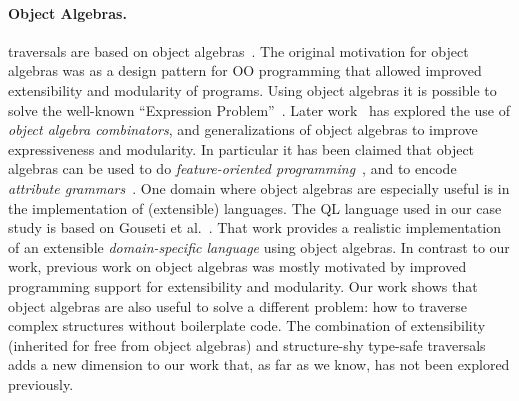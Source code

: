 

\begin{comment}
In that
approach for generalized and basic folds. These fold algebras scale up
applications involving large systems of mutually recursive
datatypes. These works all try to optimize traversal control of large
structures in functional programming paradigm, while our work solves a
similar problem in Object Algebras, a programming style in Object
Oriented Programming paradigm.
\end{comment}

\paragraph{Object Algebras.} \name traversals are based on
object algebras~\cite{bruno12oa}. The original motivation for object
algebras was as a design pattern for OO programming that allowed
improved extensibility and modularity of programs.  Using object
algebras it is possible to solve the well-known ``Expression
Problem''~\cite{wadler98expression-problem}.  Later
work~\cite{oliveira13fop,rendel14attributes} has explored the use of
\emph{object algebra combinators}, and generalizations of object
algebras to improve expressiveness and modularity. In particular it
has been claimed that object algebras can be used to do
\emph{feature-oriented programming}~\cite{oliveira13fop}, and to
encode \emph{attribute grammars}~\cite{rendel14attributes}. One domain
where object algebras are especially useful is in the implementation
of (extensible) languages.  The QL language used in our case study is
based on Gouseti et al.~\cite{gouseti14extensible}. That work
provides a realistic implementation of an extensible
\emph{domain-specific language} using object algebras. In contrast to
our work, previous work on object algebras was mostly motivated by
improved programming support for extensibility and modularity. Our
work shows that object algebras are also useful to solve a different
problem: how to traverse complex structures without boilerplate
code. The combination of extensibility (inherited for free from object
algebras) and structure-shy type-safe traversals  adds a new
dimension to our work that, as far as we know, has not been explored
previously.

